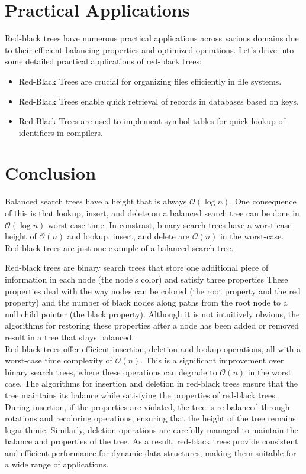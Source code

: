 \documentclass{article}[10pt]
\begin{document}
\section{Practical Applications}
Red-black trees have numerous practical applications\cite{goodrich2013data} across various domains due to their efficient balancing properties and optimized operations. Let's drive into some detailed practical applications of red-black trees: 

\begin{itemize}
    \item Red-Black Trees are crucial for organizing files efficiently in file systems. 
    \item Red-Black Trees enable quick retrieval of records in databases based on keys. 
    \item Red-Black Trees are used to implement symbol tables for quick lookup of
    identifiers in compilers.  
\end{itemize}


\section{Conclusion}

Balanced search trees have a height that is always $\mathcal{O}(\log n)$. One consequence of this is that lookup, insert, and delete on a balanced search tree can be done in $\mathcal{O}(\log n)$ worst-case time. In constrast, binary search trees have a worst-case height of $\mathcal{O}(n)$ and lookup, insert, and delete are $\mathcal{O}(n)$ in the worst-case. Red-black trees are just one example of a balanced search tree.

Red-black trees are binary search trees that store one additional piece of information in each node (the node's color) and satisfy three properties\cite{weiss2007data} These properties deal with the way nodes can be colored (the root property and the red property) and the number of black nodes along paths from the root node to a null child pointer (the black property). Although it is not intuitively obvious, the algorithms for restoring these properties after a node has been added or removed result in a tree that stays balanced.\\
Red-black trees offer efficient insertion, deletion and lookup operations, all with a worst-case time complexity of $\mathcal{O}(n)$. This is a significant improvement over binary search trees, where these operations can degrade to $\mathcal{O}(n)$ in the worst case. The algorithms for insertion and deletion in red-black trees ensure that the tree maintains its balance while satisfying the properties of red-black trees. During insertion, if the properties are violated, the tree is re-balanced through rotations and recoloring operations, ensuring that the height of the tree remains logarithmic. Similarly, deletion operations are carefully managed to maintain the balance and properties of the tree. As a result, red-black trees provide consistent and efficient performance for dynamic data structures, making them suitable for a wide range of applications.
\end{document}
